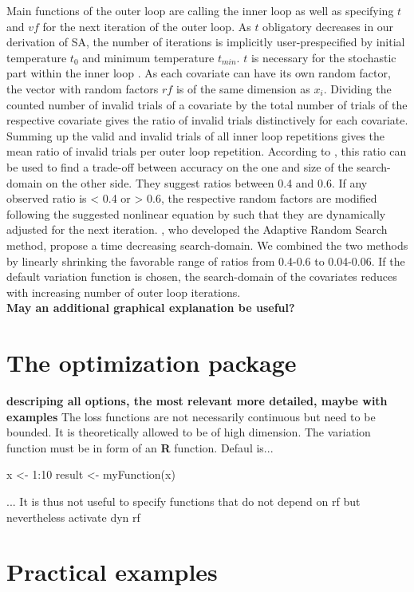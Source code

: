 Main functions of the outer loop are calling the inner loop as well as specifying $t$ and $vf$ for the next iteration of the outer loop. As $t$ obligatory decreases in our derivation of SA, the number of iterations is implicitly user-prespecified by initial temperature $t_0$ and minimum temperature $t_{min}$. $t$ is necessary for the stochastic part within the inner loop \citep{kirkpatrick_1983}. As each covariate can have its own random factor, the vector with random factors $rf$ is of the same dimension as $x_i$. Dividing the counted number of invalid trials of a covariate by the total number of trials of the respective covariate gives the ratio of invalid trials distinctively for each covariate. Summing up the valid and invalid trials of all inner loop repetitions gives the mean ratio of invalid trials per outer loop repetition. According to \citep{corana_1987}, this ratio can be used to find a trade-off between accuracy on the one and size of the search-domain on the other side. They suggest ratios between 0.4 and 0.6. If any observed ratio is < 0.4 or > 0.6, the respective random factors are modified following the suggested nonlinear equation by \citet{corana_1987} such that they are dynamically adjusted for the next iteration. \citet{pronzato_1984}, who developed the Adaptive Random Search method, propose a time decreasing search-domain. We combined the two methods by linearly shrinking the favorable range of ratios from 0.4-0.6 to 0.04-0.06. If the default variation function is chosen, the search-domain of the covariates reduces with increasing number of outer loop iterations.\\

\textbf{May an additional graphical explanation be useful?}

\section{The optimization package}
\textbf{descriping all options, the most relevant more detailed, maybe with examples}
The loss functions are not necessarily continuous but need to be bounded. It is theoretically allowed to be of high dimension.
The variation function must be in form of an \textbf{R} function. Defaul is...
\begin{example}
	x <- 1:10
	result <- myFunction(x)
\end{example}
... It is thus not useful to specify functions that do not depend on rf but nevertheless activate dyn rf

\section{Practical examples}
